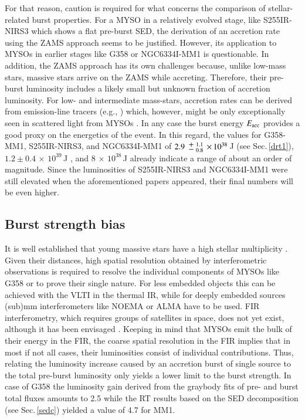 For that reason,
caution is required for what concerns the comparison of stellar-related burst properties. For a MYSO in a relatively evolved stage, like S255IR-NIRS3 which shows a flat pre-burst SED, the derivation of an accretion rate using the ZAMS approach seems to be justified. However, its application to MYSOs in earlier stages like G358 or NGC6334I-MM1 is questionable.
In addition, the ZAMS approach has its own challenges because, unlike low-mass stars, massive stars arrive on the ZAMS while accreting. Therefore, their pre-burst luminosity includes a likely small but unknown fraction of accretion luminosity. For low- and intermediate mass-stars, accretion rates can be derived from emission-line tracers (e.g., \citealp{2011A&A...535A..99M}) which, however, might be only exceptionally seen in scattered light from MYSOs \citep{1995ApJ...448..832N}. In any case the burst energy $E_{\rm acc}$ provides a good proxy on the energetics of the event. In this regard, the values for G358-MM1, S255IR-NIRS3, and NGC6334I-MM1 of %
$2.9\mypm_{0.8}^{1.1}\,{\times}\,10^{38}$\,J
(see Sec.\,\ref{drt1}), $1.2\pm{0.4}\,{\times}\,10^{39}$\,J \citep{2017NatPh..13..276C}, and $8\,{\times}\,10^{38}$\,J \citep{2017ApJ...837L..29H} already indicate a range of about an order of magnitude. Since the luminosities of S255IR-NIRS3 and NGC6334I-MM1 were still elevated when the aforementioned papers appeared, their final numbers will be even higher.

\subsection{Burst strength bias}
It is well established that young massive stars have a high stellar multiplicity \citep{2007ARA&A..45..481Z, 2019MNRAS.484..226P}. Given their distances, high spatial resolution obtained by interferometric observations is required to resolve the individual components of MYSOs like G358 or to prove their single nature. For less embedded objects this can be achieved with the VLTI in the thermal IR, while for deeply embedded sources (sub)mm interferometers like NOEMA or ALMA have to be used. 
FIR interferometry, which requires groups of satellites in space, does not yet exist, although it has been envisaged \citep{2020AdSpR..65..831L}. Keeping in mind that MYSOs emit the bulk of their energy in the FIR, the coarse spatial resolution in the FIR implies that in most if not all cases, their luminosities consist of individual contributions. Thus, relating the luminosity increase caused by an accretion burst of single source to the total pre-burst luminosity only yields a lower limit to the burst strength. In case of G358 the luminosity gain derived from the graybody fits of pre- and burst total fluxes amounts to 2.5 while the RT results based on the SED decomposition (see Sec.\,\ref{sedc}) yielded a value of 4.7 for MM1.

